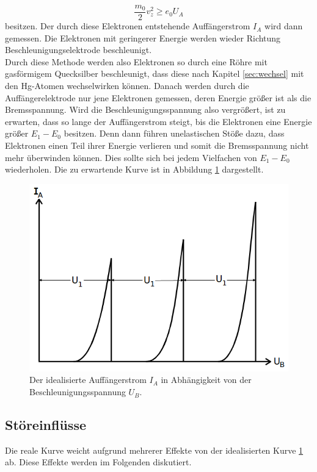 \begin{equation}
    \frac{m_0}{2}v_z^2\geq e_0U_A  
    \label{eqn:vz} 
\end{equation}
besitzen. Der durch diese Elektronen entstehende Auffängerstrom $I_A$ wird dann gemessen. Die Elektronen mit geringerer Energie werden wieder 
Richtung Beschleunigungselektrode beschleunigt. 
\\\noindent
Durch diese Methode werden also Elektronen so durch eine Röhre mit gasförmigem Quecksilber beschleunigt, dass diese nach Kapitel 
\ref{sec:wechsel} mit den Hg-Atomen wechselwirken können. Danach werden durch die Auffängerelektrode nur jene Elektronen gemessen, deren Energie
größer ist als die Bremsspannung. Wird die Beschleunigungsspannung also vergrößert, ist zu erwarten, dass so lange der Auffängerstrom 
steigt, bis die Elektronen eine Energie größer $E_1-E_0$ besitzen. Denn dann führen unelastischen Stöße dazu, dass Elektronen einen Teil
ihrer Energie verlieren und somit die Bremsspannung nicht mehr überwinden können. Dies sollte sich bei jedem Vielfachen von $E_1-E_0$ 
wiederholen. Die zu erwartende Kurve ist in Abbildung \ref{fig:fhk1} dargestellt. 
\begin{figure}[H]
    \centering
    \includegraphics[scale = 0.5]{pictures/Kurve1.png}
    \caption{Der idealisierte Auffängerstrom $I_A$ in Abhängigkeit von der Beschleunigungsspannung $U_B$. \cite{AP01}}
    \label{fig:fhk1}
\end{figure}

\subsection{Störeinflüsse}
\label{sec:stör}
Die reale Kurve weicht aufgrund mehrerer Effekte von der idealisierten Kurve \ref{fig:fhk1} ab. Diese Effekte werden im Folgenden 
diskutiert.

